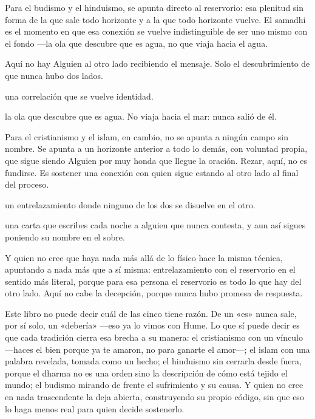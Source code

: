 \noindent Para el budismo y el hinduismo, se apunta directo al reservorio: esa plenitud sin forma de la que sale todo horizonte y a la que todo horizonte vuelve. El samadhi es el momento en que esa conexión se vuelve indistinguible de ser uno mismo con el fondo —la ola que descubre que es agua, no que viaja hacia el agua.

Aquí no hay Alguien al otro lado recibiendo el mensaje. Solo el descubrimiento de que nunca hubo dos lados.

\begin{fisica}
 una correlación que se vuelve identidad.

 la ola que descubre que es agua. No viaja hacia el mar: nunca salió de él.
\end{fisica}
\noindent Para el cristianismo y el islam, en cambio, no se apunta a ningún campo sin nombre. Se apunta a un horizonte anterior a todo lo demás, con voluntad propia, que sigue siendo Alguien por muy honda que llegue la oración. Rezar, aquí, no es fundirse. Es sostener una conexión con quien sigue estando al otro lado al final del proceso.

\begin{fisica}
 un entrelazamiento donde ninguno de los dos se disuelve en el otro.

 una carta que escribes cada noche a alguien que nunca contesta, y aun así sigues poniendo su nombre en el sobre.
\end{fisica}
Y quien no cree que haya nada más allá de lo físico hace la misma técnica, apuntando a nada más que a sí misma: entrelazamiento con el reservorio en el sentido más literal, porque para esa persona el reservorio es todo lo que hay del otro lado. Aquí no cabe la decepción, porque nunca hubo promesa de respuesta.

\noindent Este libro no puede decir cuál de las cinco tiene razón. De un «es» nunca sale, por sí solo, un «debería» —eso ya lo vimos con Hume. Lo que sí puede decir es que cada tradición cierra esa brecha a su manera: el cristianismo con un vínculo —haces el bien porque ya te amaron, no para ganarte el amor—; el islam con una palabra revelada, tomada como un hecho; el hinduismo sin cerrarla desde fuera, porque el dharma no es una orden sino la descripción de cómo está tejido el mundo; el budismo mirando de frente el sufrimiento y su causa. Y quien no cree en nada trascendente la deja abierta, construyendo su propio código, sin que eso lo haga menos real para quien decide sostenerlo.

